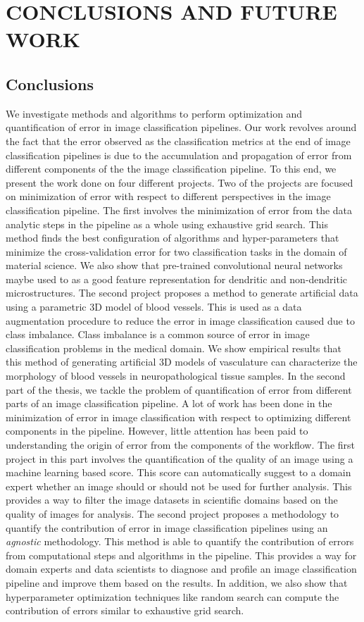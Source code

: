 \chapter{CONCLUSIONS AND FUTURE WORK}
\label{chap:conclusions}
\section{Conclusions}
We investigate methods and algorithms to perform optimization and quantification of error in image classification pipelines. Our work revolves around the fact that the error observed as the classification metrics at the end of image classification pipelines is due to the accumulation and propagation of error from different components of the the image classification pipeline. To this end, we present the work done on four different projects. Two of the projects are focused on minimization of error with respect to different perspectives in the image classification pipeline.  
The first involves the minimization of error from the data analytic steps in the pipeline as a whole using exhaustive grid search. This method finds the best configuration of algorithms and hyper-parameters that minimize the cross-validation error for two classification tasks in the domain of material science. We also show that pre-trained convolutional neural networks maybe used to as a good feature representation for dendritic and non-dendritic microstructures. 
The second project proposes a method to generate artificial data using a parametric 3D model of blood vessels. This is used as a data augmentation procedure to reduce the error in image classification caused due to class imbalance. Class imbalance is a common source of error in image classification problems in the medical domain. We show empirical results that this method of generating artificial 3D models of vasculature can characterize the morphology of blood vessels in neuropathological tissue samples. 
In the second part of the thesis, we tackle the problem of quantification of error from different parts of an image classification pipeline. A lot of work has been done in the minimization of error in image classification with respect to optimizing different components in the pipeline. However, little attention has been paid to understanding the origin of error from the components of the workflow. 
The first project in this part involves the quantification of the quality of an image using a machine learning based score. This score can automatically suggest to a domain expert whether an image should or should not be used for further analysis. This provides a way to filter the image datasets in scientific domains based on the quality of images for analysis.
The second project proposes a methodology to quantify the contribution of error in image classification pipelines using an \textit{agnostic} methodology. This method is able to quantify the contribution of errors from computational steps and algorithms in the pipeline. This provides a way for domain experts and data scientists to diagnose and profile an image classification pipeline and improve them based on the results. In addition, we also show that hyperparameter optimization techniques like random search can compute the contribution of errors similar to exhaustive grid search.

